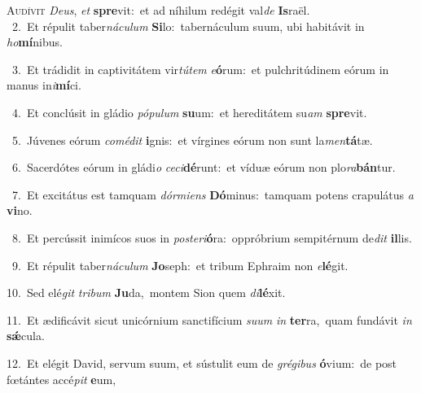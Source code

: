 \lettrine{\initial\textcolor{\initialcolor}{A}}{udívit} \textit{De}\-\textit{us}, \textit{et} \textbf{spre}\-vit:~\star et ad níhilum redégit val\textit{de} \textbf{Is}\-raël.\\
{\numbfont\textcolor{\numbcolor}{~2.}}~Et répulit taber\-\textit{ná}\-\textit{cu}\textit{lum} \textbf{Si}\-lo:~\star tabernáculum suum, ubi habitávit in \textit{ho}\-\textbf{mí}nibus.\par
{\numbfont\textcolor{\numbcolor}{~3.}}~Et trádidit in captivitátem vir\-\textit{tú}\-\textit{tem} \textit{e}\-\textbf{ó}rum:~\star et pulchritúdinem eórum in manus in\-\textit{i}\-\textbf{mí}ci.\par
{\numbfont\textcolor{\numbcolor}{~4.}}~Et conclúsit in gládio \textit{pó}\-\textit{pu}\textit{lum} \textbf{su}\-um:~\star et hereditátem su\textit{am} \textbf{spre}\-vit.\par
{\numbfont\textcolor{\numbcolor}{~5.}}~Júvenes eórum \textit{com}\-\textit{é}\textit{dit} \textbf{i}\-gnis:~\star et vírgines eórum non sunt la\-\textit{men}\-\textbf{tá}tæ.\par
{\numbfont\textcolor{\numbcolor}{~6.}}~Sacerdótes eórum in gládi\textit{o} \textit{ce}\-\textit{ci}\textbf{dé}runt:~\star et víduæ eórum non plo\-\textit{ra}\-\textbf{bán}tur.\par
{\numbfont\textcolor{\numbcolor}{~7.}}~Et excitátus est tamquam \textit{dór}\-\textit{mi}\textit{ens} \textbf{Dó}\-minus:~\star tamquam potens crapulátus \textit{a} \textbf{vi}\-no.\par
{\numbfont\textcolor{\numbcolor}{~8.}}~Et percússit inimícos suos in \textit{post}\-\textit{e}\textit{ri}\textbf{ó}ra:~\star oppróbrium sempitérnum de\textit{dit} \textbf{il}\-lis.\par
{\numbfont\textcolor{\numbcolor}{~9.}}~Et répulit taber\-\textit{ná}\-\textit{cu}\textit{lum} \textbf{Jo}\-seph:~\star et tribum Ephraim non \textit{e}\-\textbf{lé}git.\par
{\numbfont\textcolor{\numbcolor}{10.}}~Sed elé\textit{git} \textit{tri}\-\textit{bum} \textbf{Ju}\-da,~\star montem Sion quem \textit{di}\-\textbf{lé}xit.\par
{\numbfont\textcolor{\numbcolor}{11.}}~Et ædificávit sicut unicórnium sanctifícium \textit{su}\-\textit{um} \textit{in} \textbf{ter}\-ra,~\star quam fundávit \textit{in} \textbf{sǽ}\-cula.\par
{\numbfont\textcolor{\numbcolor}{12.}}~Et elégit David, servum suum, et sústulit eum de \textit{gré}\-\textit{gi}\textit{bus} \textbf{ó}\-vium:~\star de post fœtántes accé\textit{pit} \textbf{e}\-um,\par
